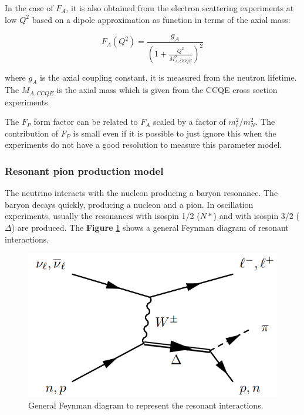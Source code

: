 In the case of $F_A$, it is also obtained from the electron scattering experiments at low $Q^2$ based on a dipole approximation as function in terms of the axial mass:

\begin{equation}
    F_A(Q^2) = \frac{g_A}{\left(1 + \frac{Q^2}{M^2_{A,CCQE}}\right)^2}
\end{equation}

where $g_A$ is the axial coupling constant, it is measured from the neutron lifetime. The $M_{A,CCQE}$ is the axial mass which is given from the CCQE cross section experiments.

The $F_P$ form factor can be related to $F_A$ scaled by a factor of $m^2_\ell / m^2_N$. The contribution of $F_P$ is small even if it is possible to just ignore this when the experiments do not have a good resolution to measure this parameter model.


\subsubsection{Resonant pion production model}
\label{Cap:Int:NuInteractions:RESmodel}

The neutrino interacts with the nucleon producing a baryon resonance. The baryon decays quickly, producing a nucleon and a pion. In oscillation experiments, usually the resonances with isospin 1/2 ($N*$) and with isospin 3/2 ($\Delta$) are produced. The \textbf{Figure} \ref{fig:Int:NuInteractions:Resmodel:FaymanDiag} shows a general Feynman diagram of resonant interactions.

\begin{figure}[!htb]
    \centering
    \includegraphics[scale=0.3]{Figures/Chapter1/ResonantInt.png}
    \caption{General Feynman diagram to represent the resonant interactions.}
    \label{fig:Int:NuInteractions:Resmodel:FaymanDiag}
\end{figure}


